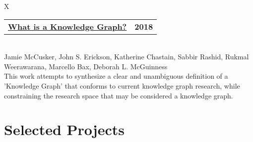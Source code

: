 \documentclass[10pt]{article}
\newcommand{\tabularxwidth}{\textwidth}
\newcommand{\changeurlcolor}[1]{\hypersetup{urlcolor=#1}}
\begin{document}
        \begin{minipage}{\tabularxwidth}
        \begin{tabularx}{\tabularxwidth}{X}
            {
                \begin{tabularx}{\tabularxwidth}{@{}X r}
                    \textbf{\changeurlcolor{black}\href{https://drive.google.com/open?id=19uND_fkRTd_m-i-SYBznq1wuCq1IvHhO}{What is a Knowledge Graph?}} &
                    \textbf{
        2018} \\
                \end{tabularx}
            } \\
            Jamie McCusker, John S. Erickson, Katherine Chastain, Sabbir Rashid, Rukmal Weerawarana, Marcello Bax, Deborah L. McGuinness \\

            
            

            
    This work attempts to synthesize a clear and unambiguous definition of a 'Knowledge Graph' that conforms to current knowledge graph research, while constraining the research space that may be considered a knowledge graph.
        \end{tabularx}

        

        \end{minipage}
    

    \vspace{-0.5em}


    
        \section{Selected Projects}
        \vspace{-.5em}

    
\end{document}
